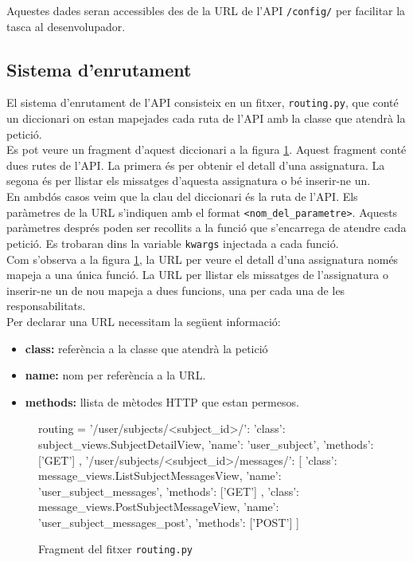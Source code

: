 Aquestes dades seran accessibles des de la \ac{URL} de l'\ac{API} \texttt{/config/} per facilitar la tasca al desenvolupador.

\subsection{Sistema d'enrutament}

El sistema d'enrutament de l'\ac{API} consisteix en un fitxer, \texttt{routing.py}, que conté un diccionari on estan mapejades cada ruta de l'\ac{API} amb la classe que atendrà la petició.\\

Es pot veure un fragment d'aquest diccionari a la figura \ref{fig:routing}. Aquest fragment conté dues rutes de l'\ac{API}. La primera és per obtenir el detall d'una assignatura. La segona és per llistar els missatges d'aquesta assignatura o bé inserir-ne un.\\

En ambdós casos veim que la clau del diccionari és la ruta de l'\ac{API}. Els paràmetres de la \ac{URL} s'indiquen amb el format \texttt{<nom\_del\_parametre>}. Aquests paràmetres després poden ser recollits a la funció que s'encarrega de atendre cada petició. Es trobaran dins la variable \texttt{kwargs} injectada a cada funció. \\

Com s'observa a la figura \ref{fig:routing}, la \ac{URL} per veure el detall d'una assignatura només mapeja a una única funció. La \ac{URL} per llistar els missatges de l'assignatura o inserir-ne un de nou mapeja a dues funcions, una per cada una de les responsabilitats.\\

Per declarar una \ac{URL} necessitam la següent informació:

\begin{itemize}
	\item \textbf{class:} referència a la classe que atendrà la petició
	\item \textbf{name:} nom per referència a la \ac{URL}.
	\item \textbf{methods:} llista de mètodes \ac{HTTP} que estan permesos.
\end{itemize}

\begin{figure}[h!]
	\begin{python}
routing = {
	'/user/subjects/<subject_id>/': {
		'class': subject_views.SubjectDetailView,
		'name': 'user_subject',
		'methods': ['GET']
	},
	'/user/subjects/<subject_id>/messages/': [
		{
			'class': message_views.ListSubjectMessagesView,
			'name': 'user_subject_messages',
			'methods': ['GET']
		},
		{
			'class': message_views.PostSubjectMessageView,
			'name': 'user_subject_messages_post',
			'methods': ['POST']
		}
	]
}
	\end{python}
	\caption{Fragment del fitxer \texttt{routing.py}}
	\label{fig:routing}
\end{figure}

